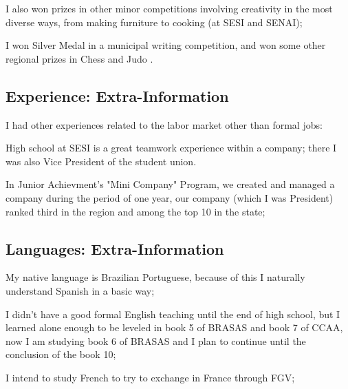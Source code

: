 \begin{paracol}{2}
\begin{rightcolumn}
		I also won prizes in other minor competitions involving creativity in the most diverse ways, from making furniture to cooking (at SESI and SENAI);\newline
		
		I won Silver Medal in a municipal writing competition, and won some other regional prizes in Chess and Judo .\newline
		
		
		\subsection*{Experience: Extra-Information}
		
		I had other experiences related to the labor market other than formal jobs:\newline
		
		High school at SESI is a great teamwork experience within a company; there I was also Vice President of the student union.\newline
		
		In Junior Achievment’s "Mini Company" Program, we created and managed a company during the period of one year, our company (which I was President) ranked third in the region and among the top 10 in the state;\newline
		
		
		\subsection*{Languages: Extra-Information}
		
		My native language is Brazilian Portuguese, because of this I naturally understand Spanish in a basic way;\newline
		
		I didn’t have a good formal English teaching until the end of high school, but I learned alone enough to be leveled in book 5 of BRASAS and book 7 of CCAA, now I am studying book 6 of BRASAS and I plan to continue until the conclusion of the book 10;\newline
		
		I intend to study French to try to exchange in France through FGV;
		
		
		
		
	\end{rightcolumn}
\end{paracol}

%